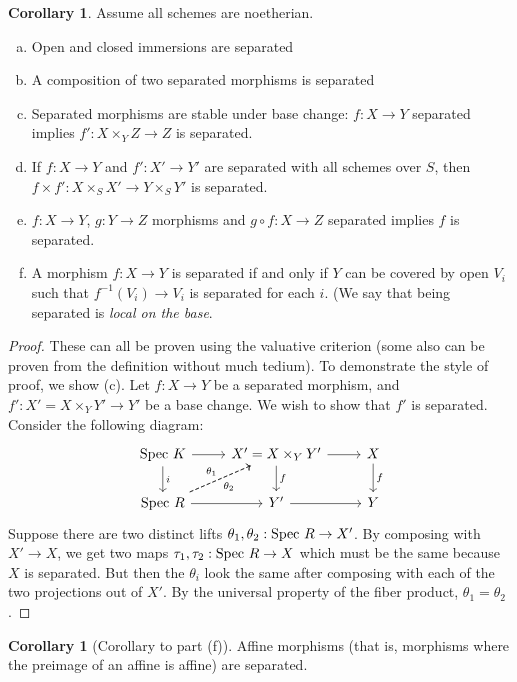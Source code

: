 \documentclass[10pt,reqno]{amsart}
\theoremstyle{definition}
\newtheorem{corollary}[theorem]{Corollary}
\theoremstyle{remark}
\numberwithin{equation}{section}
\numberwithin{theorem}{section}
\newcommand{\spec}{\textup{Spec }}
\begin{document}
 \begin{corollary} Assume all schemes are noetherian.
 \begin{enumerate}[(a)]
 \item Open and closed immersions are separated
 \item A composition of two separated morphisms is separated
 \item Separated morphisms are stable under base change: $f: X \to Y$ separated implies $f': X \times_Y Z \to Z$ is separated.
 \item If $f: X \to Y$ and $f': X' \to Y'$ are separated with all schemes over $S$, then $f \times f': X \times_S X' \to Y \times_S Y'$ is separated.
 \item $f: X \to Y$, $g: Y \to Z$ morphisms and $g \circ f: X \to Z$ separated implies $f$ is separated.
 \item A morphism $f: X \to Y$ is separated if and only if $Y$ can be covered by open $V_i$ such that $f^{-1}(V_i) \to V_i$ is separated for each $i$. (We say that being separated is \textit{local on the base}.
 \end{enumerate}
 \end{corollary}
\begin{proof}
These can all be proven using the valuative criterion (some also can be proven from the definition without much tedium). To demonstrate the style of proof, we show (c). Let $f: X \to Y$ be a separated morphism, and $f': X' = X \times_Y Y' \to Y'$ be a base change. We wish to show that $f'$ is separated. Consider the following diagram:
\[
\begin{tikzcd}
\spec K \arrow[r] \arrow[d,"i"]& X' = X \times_Y Y' \arrow[d,"f"] \arrow[r]& X \arrow[d,"f"]\\
\spec R \arrow[r] \arrow[ur, dashed, "\theta_1"] \arrow[ur, dashed, swap, "\theta_2"] & Y' \arrow[r] & Y
\end{tikzcd}
\]
Suppose there are two distinct lifts $\theta_1,\theta_2 : \spec R \to X'$. By composing with $X' \to X$, we get two maps $\tau_1, \tau_2 : \spec R \to X$ which must be the same because $X$ is separated. But then the $\theta_i$ look the same after composing with each of the two projections out of $X'$. By the universal property of the fiber product, $\theta_1 = \theta_2$.
\end{proof}

\begin{corollary}[Corollary to part (f)] Affine morphisms (that is, morphisms where the preimage of an affine is affine) are separated.
\end{corollary}
\end{document}
